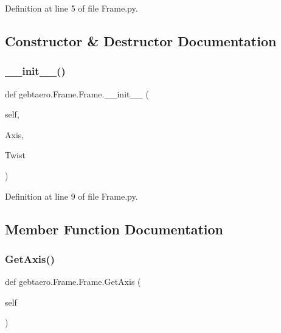 Definition at line 5 of file Frame.\+py.



\subsection{Constructor \& Destructor Documentation}
\mbox{\label{classgebtaero_1_1_frame_1_1_frame_a39d919d9d67030dafbe8a4cf44ea53d5}} 
\subsubsection{\texorpdfstring{\+\_\+\+\_\+init\+\_\+\+\_\+()}{\_\_init\_\_()}}
{\footnotesize\ttfamily def gebtaero.\+Frame.\+Frame.\+\_\+\+\_\+init\+\_\+\+\_\+ (\begin{DoxyParamCaption}\item[{}]{self,  }\item[{}]{Axis,  }\item[{}]{Twist }\end{DoxyParamCaption})}



Definition at line 9 of file Frame.\+py.



\subsection{Member Function Documentation}
\mbox{\label{classgebtaero_1_1_frame_1_1_frame_a72f88d5e0ae61e459545178d564caaf6}} 
\subsubsection{\texorpdfstring{Get\+Axis()}{GetAxis()}}
{\footnotesize\ttfamily def gebtaero.\+Frame.\+Frame.\+Get\+Axis (\begin{DoxyParamCaption}\item[{}]{self }\end{DoxyParamCaption})}



